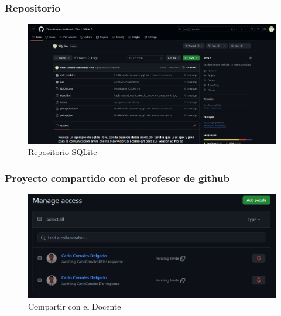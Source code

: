 \documentclass{article}
\begin{document}

	\subsubsection{Repositorio}
  \begin{figure}[H]
    \centering
    \includegraphics[width=1\textwidth, keepaspectratio]{img/repositorio.png}
    \caption{Repositorio SQLite}
  \end{figure}
  \newpage
  

	\subsubsection{Proyecto compartido con el profesor de github}
  \begin{figure}[H]
    \centering
    \includegraphics[width=1\textwidth, keepaspectratio]{img/Compartir.png}
    \caption{Compartir con el Docente}
  \end{figure}
  
\end{document}
